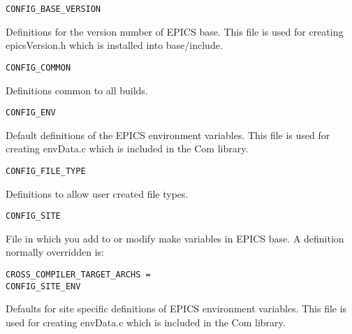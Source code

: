 \begin{description}
\end{description}\begin{verbatim}CONFIG_BASE_VERSION
\end{verbatim}\begin{description}\item Definitions for the version number of EPICS base. This file is used for creating epicsVersion.h which is installed 
into base/include.

\end{description}\begin{verbatim}CONFIG_COMMON
\end{verbatim}\begin{description}\item Definitions common to all builds.

\end{description}\begin{verbatim}CONFIG_ENV
\end{verbatim}\begin{description}\item Default definitions of the EPICS environment variables. This file is used for creating envData.c which is included 
in the Com library.

\end{description}\begin{verbatim}CONFIG_FILE_TYPE
\end{verbatim}\begin{description}\item Definitions to allow user created file types.

\end{description}\begin{verbatim}CONFIG_SITE
\end{verbatim}\begin{description}\item File in which you add to or modify make variables in EPICS base. A definition normally overridden is:

\end{description}\begin{verbatim}CROSS_COMPILER_TARGET_ARCHS =
CONFIG_SITE_ENV
\end{verbatim}\begin{description}\item Defaults for site specific definitions of EPICS environment variables. This file is used for creating envData.c 
which is included in the Com library.


\end{description}
